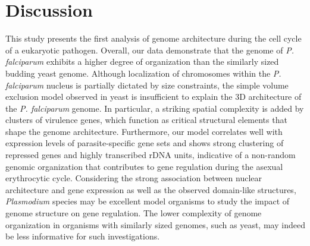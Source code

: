 \section*{Discussion}
This study presents the first analysis of genome architecture during the cell cycle of a eukaryotic pathogen. Overall, our data demonstrate that the genome of {\em P. falciparum} exhibits a higher degree of organization than the similarly sized budding yeast genome. Although localization of chromosomes within the {\em P. falciparum} nucleus is partially dictated by size constraints, the simple volume exclusion model observed in yeast is insufficient to explain the 3D architecture of the {\em P. falciparum} genome. In particular, a striking spatial complexity is added by clusters of virulence genes, which function as critical structural elements that shape the genome architecture. Furthermore, our model correlates well with expression levels of parasite-specific gene sets and shows strong clustering of repressed genes and highly transcribed rDNA units, indicative of a non-random genomic organization that contributes to gene regulation during the asexual erythrocytic cycle. Considering the strong association between nuclear architecture and gene expression as well as the observed domain-like structures, {\em Plasmodium} species may be excellent model organisms to study the impact of genome structure on gene regulation. The lower complexity of genome organization in organisms with similarly sized genomes, such as yeast, may indeed be less informative for such investigations.

